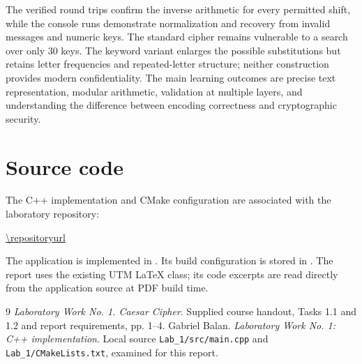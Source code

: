\documentclass{utmreport}
\begin{document}
The verified round trips confirm the inverse arithmetic for every permitted shift, while the console runs demonstrate normalization and recovery from invalid messages and numeric keys. The standard cipher remains vulnerable to a search over only 30 keys. The keyword variant enlarges the possible substitutions but retains letter frequencies and repeated-letter structure; neither construction provides modern confidentiality. The main learning outcomes are precise text representation, modular arithmetic, validation at multiple layers, and understanding the difference between encoding correctness and cryptographic security.

\chapter*{Source code}
The C++ implementation and CMake configuration are associated with the laboratory repository:
\begin{center}\url{\repositoryurl}\end{center}
The application is implemented in . Its build configuration is stored in . The report uses the existing UTM LaTeX class; its code excerpts are read directly from the application source at PDF build time.
\begin{thebibliography}{9}
 \textit{Laboratory Work No. 1. Caesar Cipher}. Supplied course handout, Tasks 1.1 and 1.2 and report requirements, pp. 1--4.
 Gabriel Balan. \textit{Laboratory Work No. 1: C++ implementation}. Local source \texttt{Lab\_1/src/main.cpp} and \texttt{Lab\_1/CMakeLists.txt}, examined for this report.
\end{thebibliography}
\end{document}
